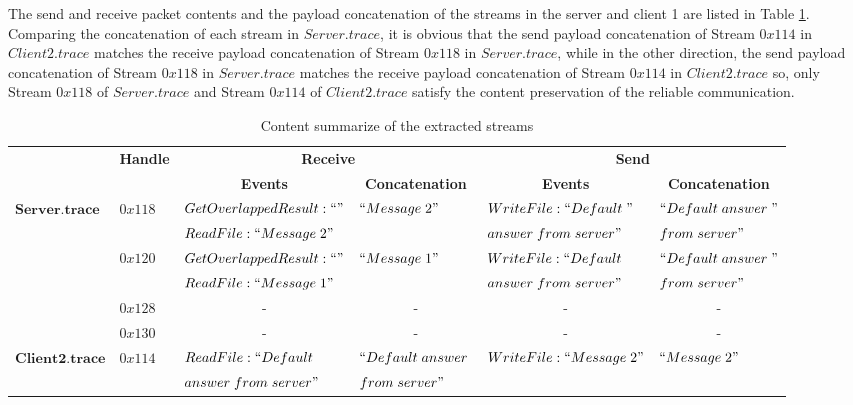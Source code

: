 The send and receive packet contents and the payload concatenation of the streams in the server and client 1 are listed in Table \ref{contentresult22}. Comparing the concatenation of each stream in $Server.trace$, it is obvious that the send payload concatenation of Stream $0x114$ in $Client2.trace$ matches the receive payload concatenation of Stream $0x118$ in $Server.trace$, while in the other direction, the send payload concatenation of Stream $0x118$ in $Server.trace$ matches the receive payload concatenation of Stream $0x114$ in $Client2.trace$ so, only Stream $0x118$ of $Server.trace$ and Stream $0x114$ of $Client2.trace$ satisfy the content preservation of the reliable communication. 

\begin{table}[H]
  \tiny
  \centering
  \caption{Content summarize of the extracted streams}
  \label{contentresult22}
  \begin{tabular}{|l|l|l|l|l|l|}
\hline            
& \multirow{2}{*}{\textbf{Handle}} & \multicolumn{2}{c|}{\textbf{Receive} }&\multicolumn{2}{c|}{\textbf{Send}} \\
\cline{3-6}
& &\multicolumn{1}{c|}{ \textbf{Events} }&\multicolumn{1}{c|}{\textbf{ Concatenation}}&\multicolumn{1}{c|}{ \textbf{Events} }&\multicolumn{1}{c|}{\textbf{ Concatenation}}\\
\hline 
\multirow{6}{*}{$\boldsymbol{Server.trace}$} &\multirow{2}{*}{$0x118$} & $GetOverlappedResult:``"$ & \multirow{2}{*}{$``Message\; 2"$} & $WriteFile:``Default\; "$ &  $``Default\; answer\; "$\\
\cline{3-3}
& &$ReadFile:``Message\; 2"$ &  & $answer\; from\; server"$&$from\; server"$\\
\cline{2-6}    
      &\multirow{2}{*}{$0x120$} & $GetOverlappedResult:``"$ & \multirow{2}{*}{$``Message\; 1"$} & $WriteFile:``Default\; $ &  $``Default\; answer\; "$\\
\cline{3-3}
& &$ReadFile:``Message\; 1"$ & &$answer\; from\; server"$ &$from\; server"$\\  
\cline{2-6}   
& $0x128$&\multicolumn{1}{c|}{- }&\multicolumn{1}{c|}{- } &\multicolumn{1}{c|}{- } &\multicolumn{1}{c|}{- }\\  
\cline{2-6}   
& $0x130$&\multicolumn{1}{c|}{- } &\multicolumn{1}{c|}{- } &\multicolumn{1}{c|}{- } &\multicolumn{1}{c|}{- }\\      
\hline  
\multirow{2}{*}{$\boldsymbol{Client2.trace}$ }&\multirow{2}{*}{$0x114$ }& $ReadFile: ``Default\; $ & $``Default\; answer\; $ & \multirow{2}{*}{$WriteFile:``Message\; 2"$ } &  \multirow{2}{*}{$``Message\; 2"$}\\
& &$answer\; from\; server"$& $ from\; server"$ & &\\
\hline
  \end{tabular}
\end{table}



